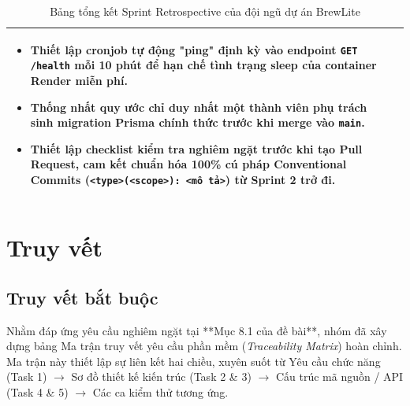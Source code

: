 \documentclass[a4paper]{article}
\begin{document}
\begin{table}[H]
\begin{tabularx}{\textwidth}{|X|X|}
\begin{itemize}[leftmargin=10pt]
    \item Thiết lập cronjob tự động "ping" định kỳ vào endpoint \texttt{GET /health} mỗi 10 phút để hạn chế tình trạng sleep của container Render miễn phí.
    \item Thống nhất quy ước chỉ duy nhất một thành viên phụ trách sinh migration Prisma chính thức trước khi merge vào \texttt{main}.
    \item Thiết lập checklist kiểm tra nghiêm ngặt trước khi tạo Pull Request, cam kết chuẩn hóa 100\% cú pháp Conventional Commits (\texttt{<type>(<scope>): <mô tả>}) từ Sprint 2 trở đi.
\end{itemize} \\
\hline
\end{tabularx}
\caption{Bảng tổng kết Sprint Retrospective của đội ngũ dự án BrewLite}
\label{tab:sprint-retro}
\end{table}

\section{Truy vết}

\subsection{Truy vết bắt buộc}

Nhằm đáp ứng yêu cầu nghiêm ngặt tại **Mục 8.1 của đề bài**, nhóm đã xây dựng bảng Ma trận truy vết yêu cầu phần mềm (\textit{Traceability Matrix}) hoàn chỉnh. Ma trận này thiết lập sự liên kết hai chiều, xuyên suốt từ Yêu cầu chức năng (Task 1) $\longrightarrow$ Sơ đồ thiết kế kiến trúc (Task 2 \& 3) $\longrightarrow$ Cấu trúc mã nguồn / API (Task 4 \& 5) $\longrightarrow$ Các ca kiểm thử tương ứng.
\end{document}
